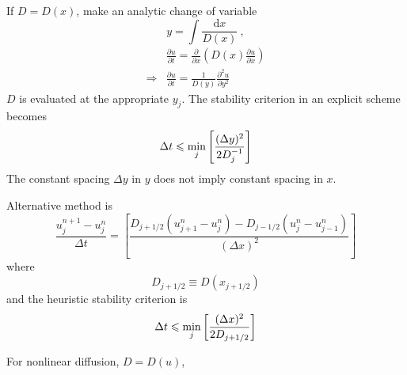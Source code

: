 \documentclass[12pt,a4paper]{article}
\newcommand{\dif}{\mathrm{d}}
\begin{document}
If $D = D(x)$, make an analytic change of variable
\begin{equation}
y = \int \frac{\dif x}{D(x)} ~,
\end{equation}
\begin{align}
& \frac{\partial u}{\partial t} = \frac{\partial}{\partial x} \left(D(x) \frac{\partial u}{\partial x} \right) \\
\Longrightarrow & \frac{\partial u}{\partial t} = \frac{1}{D(y)} \frac{\partial^2 u}{\partial y^2}
\end{align}
$D$ is evaluated at the appropriate $y_j$. The stability criterion in an explicit scheme becomes
\begin{equation}
\Delta t \leqslant \underset{j}{\rm min} \left[\frac{(\Delta y)^2}{2D_j^{-1} } \right]
\end{equation}
The constant spacing $\Delta y$ in $y$ does not imply constant spacing in $x$.

Alternative method is
\begin{equation}
\frac{u_j^{n+1} -u_j^{n}}{\Delta t} =  \left[\frac{D_{j+1/2}(u_{j+1}^{n} -u_j^{n} ) -D_{j-1/2}(u_{j}^{n} -u_{j-1}^{n} ) }{(\Delta x)^2} \right]
\end{equation}
where
\begin{equation}
D_{j+1/2} \equiv D(x_{j+1/2})
\end{equation}
and the heuristic stability criterion is
\begin{equation}
\Delta t \leqslant \underset{j}{\rm min} \left[\frac{(\Delta x)^2}{2D_{j+1/2} } \right]
\end{equation}

For nonlinear diffusion, $D = D(u)$, 
\end{document}
